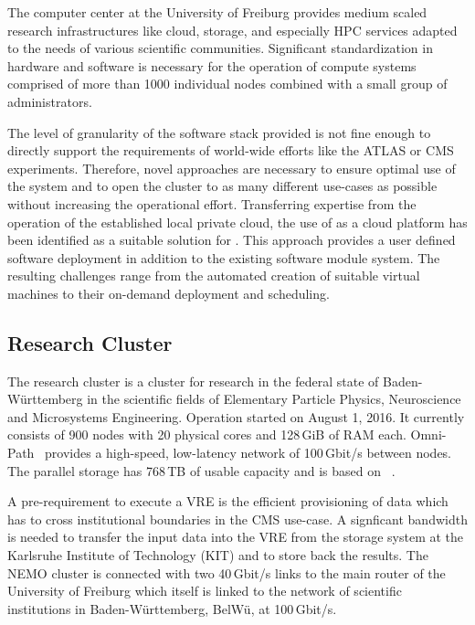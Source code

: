 The computer center at the University of Freiburg provides
medium scaled research
infrastructures like cloud, storage, and especially HPC services adapted to the
needs of various scientific communities. Significant standardization
in hardware and software is necessary for the operation of compute systems comprised of
more than 1000 individual nodes combined with a small group of administrators.

The level of granularity of the software stack provided is not fine enough to
directly support the requirements of world-wide efforts like the
ATLAS or CMS experiments.
Therefore, novel approaches are necessary to ensure optimal use of the system and to open the cluster to as many different use-cases as
possible without increasing the operational effort.
Transferring expertise from the operation of the established local
private cloud, 
the use of \Openstack as a cloud platform has been identified
as a
suitable solution for \NEMO. This approach provides a user defined software
deployment in addition to the existing software module system.
The resulting challenges range from the automated creation of suitable
virtual machines to their on-demand deployment and scheduling.

\subsection{Research Cluster \NEMO}

The research cluster \NEMO is a cluster for 
research in the federal state of Baden-W\"urttemberg in the scientific fields of Elementary Particle Physics, Neuroscience and
Microsystems Engineering. Operation started on  August 1, 2016.
It currently consists of 900 nodes with 20 physical cores and 128\,GiB of RAM each.
Omni-Path~\cite{Omnipath} provides a high-speed, low-latency network of 100\,Gbit/s between nodes.
The parallel storage has
768\,TB of usable capacity and is based on \BeeGFS~\cite{BeeGFS}.


A pre-requirement to execute a VRE is the efficient
provisioning of data which has to cross institutional boundaries in the CMS use-case.
A signficant bandwidth is needed to transfer the input data into the VRE from the storage system at
the Karlsruhe Institute of Technology (KIT) and to store back the results. The
NEMO cluster is connected with two 40\,Gbit/s links to the main router of the
University of Freiburg which itself is linked to the network of
scientific institutions in Baden-W\"urttemberg, BelW\"u, at
100\,Gbit/s.

